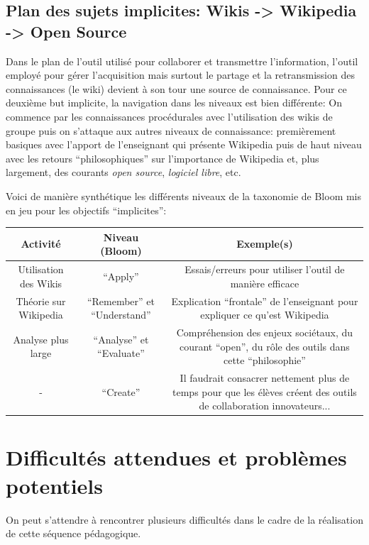 \documentclass[11pt,bibliography=totoc]{scrartcl}
\newcommand\ajout[1]{{\color{blue} #1}}
\begin{document}
\subsection{Plan des sujets implicites: Wikis -> Wikipedia -> Open Source}
Dans le plan de l'outil utilisé pour collaborer et transmettre l'information,
l'outil employé pour gérer l'acquisition mais surtout le partage et la
retransmission des connaissances (le wiki) devient à son tour une source de
connaissance.  Pour ce deuxième but implicite, la navigation dans les niveaux est
bien différente: On commence par les connaissances procédurales avec
l'utilisation des wikis de groupe puis on s'attaque aux autres niveaux de
connaissance: premièrement basiques avec l'apport de l'enseignant qui présente
Wikipedia puis de haut niveau avec les retours ``philosophiques'' sur
l'importance de Wikipedia et, plus largement, des courants \textit{open source},
\textit{logiciel libre}, etc.
\ajout{
Voici de manière synthétique les différents niveaux de la taxonomie de Bloom mis en jeu pour les objectifs ``implicites'':

\begin{center}
   \begin{tabular}{| c | c | c | }
     \hline
     Activité & Niveau (Bloom) & Exemple(s) \\ 
     \hline
     Utilisation des Wikis & ``Apply'' & Essais/erreurs pour utiliser l'outil de manière efficace \\ 
     \hline
     Théorie sur Wikipedia & ``Remember'' et ``Understand'' & Explication ``frontale'' de l'enseignant pour expliquer ce qu'est Wikipedia \\
     \hline
     Analyse plus large & ``Analyse'' et ``Evaluate'' & Compréhension des enjeux sociétaux, du courant ``open'', du rôle des outils dans cette ``philosophie'' \\
     \hline
     - & ``Create'' & Il faudrait consacrer nettement plus de temps pour que les élèves créent des outils de collaboration innovateurs... \\
     \hline
   \end{tabular}
 \end{center}
}


\section{Difficultés attendues et problèmes potentiels}
On peut s'attendre à rencontrer plusieurs difficultés dans le cadre de la
réalisation de cette séquence pédagogique.
\end{document}
